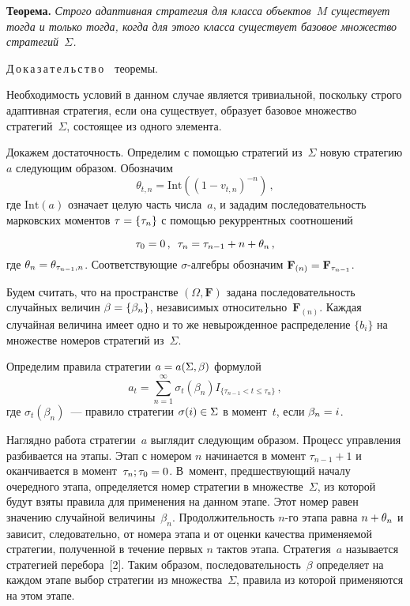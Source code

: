 \begin{multicols}{2}
  \smallskip
  
  \noindent
  \textbf{Теорема.} \textit{Строго адаптивная стратегия для класса объектов~$M$ 
существует тогда и только тогда, когда для этого класса существует базовое 
множество стратегий~$\Sigma$.}



\bigskip


\noindent
Д\,о\,к\,а\,з\,а\,т\,е\,л\,ь\,с\,т\,в\,о\ \ теоремы.

Необходимость условий в данном случае является тривиальной, поскольку строго 
адаптивная стратегия, если она существует, образует базовое множество 
стратегий~$\Sigma$, состоящее из одного элемента.
  
  Докажем достаточность. Определим с по\-мощью стратегий из~$\Sigma$ новую 
стратегию $a$ следующим образом. Обозначим
  $$
  \theta_{t,n}=\mathrm{Int}\left(\left( 1-v_{t,n}\right)^{-n}\right)\,,
  $$
где $\mathrm{Int}\left(a\right)$ означает целую часть числа~$a$, и зададим 
последовательность марковских моментов $\tau\hm=\{\tau_n\}$ с помощью рекуррентных 
соотношений

\pagebreak

\noindent
$$
\tau_0=0\,,\enskip \tau_n=\tau_{n-1}+n+\theta_n\,,
$$
где $\theta_n\hm=\theta_{\tau_{n-1},n}$. Соответствующие $\sigma$-ал\-геб\-ры обозначим 
$\mathbf{F}_{(n)}\hm=\mathbf{F}_{\tau_{n-1}}$.
  
  Будем считать, что на пространстве $(\Omega,\mathbf{F})$ задана последовательность 
случайных величин $\beta\hm=\{\beta_n\}$, независимых 
относительно~$\mathbf{F}_{(n)}$. Каждая случайная величина имеет одно и то же 
невырожденное распределение $\{b_i\}$ на множестве номеров стратегий из~$\Sigma$.
  
  Определим правила стратегии $a\hm=a(\Sigma,\beta)$ формулой
  $$
  a_t=\sum\limits_{n=1}^\infty \sigma_t(\beta_n) I_{\{\tau_{n-1}<t\leq \tau_n\}}\,,
  $$
где $\sigma_t(\beta_n)$~--- правило стратегии $\sigma(i)\hm\in\Sigma$ в момент~$t$, если 
$\beta_n\hm=i$.
  
  Наглядно работа стратегии~$a$ выглядит следующим образом. Процесс управления 
разбивается на этапы. Этап с номером $n$ начинается в момент $\tau_{n-1}+1$ и 
оканчивается в момент~$\tau_n;\tau_0\hm=0$. В~момент, предшествующий началу 
очередного этапа, определяется номер стратегии в множестве~$\Sigma$, из которой будут 
взяты правила для применения на данном этапе. Этот номер равен значению случайной 
величины~$\beta_n$. Продолжительность $n$-го этапа равна $n\hm+\theta_n$ и зависит, 
следовательно, от номера этапа и от оценки качества применяемой стратегии, полученной 
в течение первых $n$ тактов этапа. Стратегия~$a$ называется стратегией перебора~[2]. 
Таким образом, последовательность~$\beta$ определяет на каждом этапе выбор стратегии 
из множества~$\Sigma$, правила из которой применяются на этом этапе.
  

\end{multicols}
